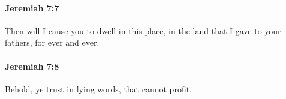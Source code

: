 		\paragraph{Jeremiah 7:7} %
			\label{JEREMIAH-7-7}

			Then will I cause you to dwell in this place, in the land that I gave to your fathers, for ever and ever.


		\paragraph{Jeremiah 7:8} %
			\label{JEREMIAH-7-8}

			Behold, ye trust in lying words, that cannot profit.


